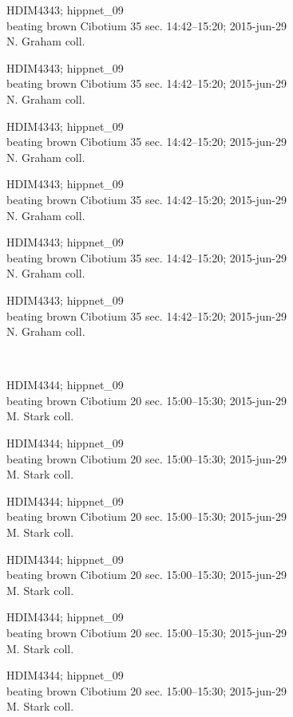 \documentclass[2pt]{extarticle}
\begin{document}
\noindent
\parbox{0.16\textwidth}{\tiny \raggedright \rule[-0.3\baselineskip]{0pt}{10pt}HDIM4343; hippnet\_09\\ beating brown Cibotium 35 sec. 14:42--15:20; 2015-jun-29\\ N. Graham coll.}
\parbox{0.16\textwidth}{\tiny \raggedright \rule[-0.3\baselineskip]{0pt}{10pt}HDIM4343; hippnet\_09\\ beating brown Cibotium 35 sec. 14:42--15:20; 2015-jun-29\\ N. Graham coll.}
\parbox{0.16\textwidth}{\tiny \raggedright \rule[-0.3\baselineskip]{0pt}{10pt}HDIM4343; hippnet\_09\\ beating brown Cibotium 35 sec. 14:42--15:20; 2015-jun-29\\ N. Graham coll.}
\parbox{0.16\textwidth}{\tiny \raggedright \rule[-0.3\baselineskip]{0pt}{10pt}HDIM4343; hippnet\_09\\ beating brown Cibotium 35 sec. 14:42--15:20; 2015-jun-29\\ N. Graham coll.}
\parbox{0.16\textwidth}{\tiny \raggedright \rule[-0.3\baselineskip]{0pt}{10pt}HDIM4343; hippnet\_09\\ beating brown Cibotium 35 sec. 14:42--15:20; 2015-jun-29\\ N. Graham coll.}
\parbox{0.16\textwidth}{\tiny \raggedright \rule[-0.3\baselineskip]{0pt}{10pt}HDIM4343; hippnet\_09\\ beating brown Cibotium 35 sec. 14:42--15:20; 2015-jun-29\\ N. Graham coll.} \\ 
\vspace{0.001in} 

\noindent
\parbox{0.16\textwidth}{\tiny \raggedright \rule[-0.3\baselineskip]{0pt}{10pt}HDIM4344; hippnet\_09\\ beating brown Cibotium 20 sec. 15:00--15:30; 2015-jun-29\\ M. Stark coll.}
\parbox{0.16\textwidth}{\tiny \raggedright \rule[-0.3\baselineskip]{0pt}{10pt}HDIM4344; hippnet\_09\\ beating brown Cibotium 20 sec. 15:00--15:30; 2015-jun-29\\ M. Stark coll.}
\parbox{0.16\textwidth}{\tiny \raggedright \rule[-0.3\baselineskip]{0pt}{10pt}HDIM4344; hippnet\_09\\ beating brown Cibotium 20 sec. 15:00--15:30; 2015-jun-29\\ M. Stark coll.}
\parbox{0.16\textwidth}{\tiny \raggedright \rule[-0.3\baselineskip]{0pt}{10pt}HDIM4344; hippnet\_09\\ beating brown Cibotium 20 sec. 15:00--15:30; 2015-jun-29\\ M. Stark coll.}
\parbox{0.16\textwidth}{\tiny \raggedright \rule[-0.3\baselineskip]{0pt}{10pt}HDIM4344; hippnet\_09\\ beating brown Cibotium 20 sec. 15:00--15:30; 2015-jun-29\\ M. Stark coll.}
\parbox{0.16\textwidth}{\tiny \raggedright \rule[-0.3\baselineskip]{0pt}{10pt}HDIM4344; hippnet\_09\\ beating brown Cibotium 20 sec. 15:00--15:30; 2015-jun-29\\ M. Stark coll.} \\ 
\vspace{0.001in} 
\end{document}
